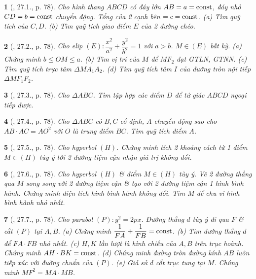 \documentclass{article}
\newtheorem{baitoan}{}
\begin{document}
\begin{baitoan}[\cite{Hai_Hung_Thu_Tung_ncpt_Toan_10_tap_2}, 27.1., p. 78]
	Cho hình thang $ABCD$ có đáy lớn $AB = a = {\rm const}$, đáy nhỏ $CD = b = {\rm const}$ chuyển động. Tổng của 2 cạnh bên $= c = {\rm const}$. (a) Tìm quỹ tích của $C,D$. (b) Tìm quỹ tích giao điểm $E$ của 2 đường chéo.
\end{baitoan}

\begin{baitoan}[\cite{Hai_Hung_Thu_Tung_ncpt_Toan_10_tap_2}, 27.2., p. 78]
	Cho elip $(E):\dfrac{x^2}{a^2} + \dfrac{y^2}{b^2} = 1$ với $a > b$. $M\in(E)$ bất kỳ. (a) Chứng minh $b\le OM\le a$. (b) Tìm vị trí của $M$ để $MF_2$ đạt {\rm GTLN, GTNN}. (c) Tìm quỹ tích trực tâm $\Delta MA_1A_2$. (d) Tìm quỹ tích tâm $I$ của đường tròn nội tiếp $\Delta MF_1F_2$.
\end{baitoan}

\begin{baitoan}[\cite{Hai_Hung_Thu_Tung_ncpt_Toan_10_tap_2}, 27.3., p. 78]
	Cho $\Delta ABC$. Tìm tập hợp các điểm $D$ để tứ giác $ABCD$ ngoại tiếp được.
\end{baitoan}

\begin{baitoan}[\cite{Hai_Hung_Thu_Tung_ncpt_Toan_10_tap_2}, 27.4., p. 78]
	Cho $\Delta ABC$ có $B,C$ cố định, $A$ chuyển động sao cho $AB\cdot AC = AO^2$ với $O$ là trung điểm $BC$. Tìm quỹ tích điểm $A$.
\end{baitoan}

\begin{baitoan}[\cite{Hai_Hung_Thu_Tung_ncpt_Toan_10_tap_2}, 27.5., p. 78]
	Cho hyperbol $(H)$. Chứng minh tích 2 khoảng cách từ 1 điểm $M\in(H)$ tùy ý tới 2 đường tiệm cận nhận giá trị không đổi.
\end{baitoan}

\begin{baitoan}[\cite{Hai_Hung_Thu_Tung_ncpt_Toan_10_tap_2}, 27.6., p. 78]
	Cho hyperbol $(H)$ \& điểm $M\in(H)$ tùy ý. Vẽ 2 đường thẳng qua $M$ song song với 2 đường tiệm cận \& tạo với 2 đường tiệm cận 1 hình bình hành. Chứng minh diện tích hình bình hành không đổi. Tìm $M$ để chu vi hình bình hành nhỏ nhất.
\end{baitoan}

\begin{baitoan}[\cite{Hai_Hung_Thu_Tung_ncpt_Toan_10_tap_2}, 27.7., p. 78]
	Cho parabol $(P):y^2 = 2px$. Đường thẳng $d$ tùy ý đi qua $F$ \& cắt $(P)$ tại $A,B$. (a) Chứng minh $\dfrac{1}{FA} + \dfrac{1}{FB} = {\rm const}$. (b) Tìm đường thẳng $d$ để $FA\cdot FB$ nhỏ nhất. (c) $H,K$ lần lượt là hình chiếu của $A,B$ trên trục hoành. Chứng minh $AH\cdot BK = {\rm const}$. (d) Chứng minh đường tròn đường kính $AB$ luôn tiếp xúc với đường chuẩn của $(P)$. (e) Giả sử $d$ cắt trục tung tại $M$. Chứng minh $MF^2 = MA\cdot MB$.
\end{baitoan}
\end{document}
